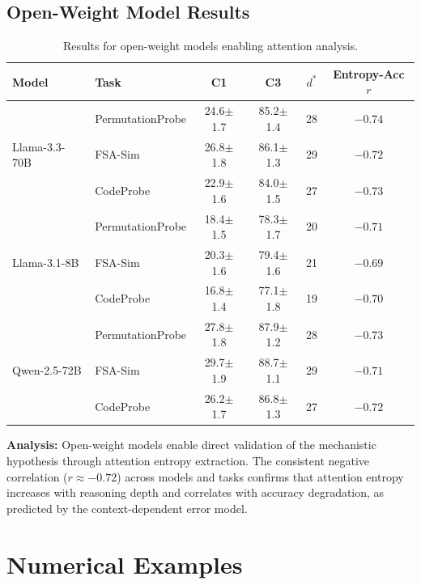 \documentclass{article}
\theoremstyle{plain}
\theoremstyle{definition}
\theoremstyle{remark}
\begin{document}
\subsection{Open-Weight Model Results}

\begin{table}[h]
\centering
\caption{Results for open-weight models enabling attention analysis.}
\label{tab:results_openweight}
\small
\begin{tabular}{@{}llcccc@{}}
\toprule
\textbf{Model} & \textbf{Task} & \textbf{C1} & \textbf{C3} & \textbf{$d^*$} & \textbf{Entropy-Acc $r$} \\
\midrule
\multirow{3}{*}{Llama-3.3-70B}
& PermutationProbe & 24.6$\pm$1.7 & 85.2$\pm$1.4 & 28 & $-0.74$ \\
& FSA-Sim & 26.8$\pm$1.8 & 86.1$\pm$1.3 & 29 & $-0.72$ \\
& CodeProbe & 22.9$\pm$1.6 & 84.0$\pm$1.5 & 27 & $-0.73$ \\
\midrule
\multirow{3}{*}{Llama-3.1-8B}
& PermutationProbe & 18.4$\pm$1.5 & 78.3$\pm$1.7 & 20 & $-0.71$ \\
& FSA-Sim & 20.3$\pm$1.6 & 79.4$\pm$1.6 & 21 & $-0.69$ \\
& CodeProbe & 16.8$\pm$1.4 & 77.1$\pm$1.8 & 19 & $-0.70$ \\
\midrule
\multirow{3}{*}{Qwen-2.5-72B}
& PermutationProbe & 27.8$\pm$1.8 & 87.9$\pm$1.2 & 28 & $-0.73$ \\
& FSA-Sim & 29.7$\pm$1.9 & 88.7$\pm$1.1 & 29 & $-0.71$ \\
& CodeProbe & 26.2$\pm$1.7 & 86.8$\pm$1.3 & 27 & $-0.72$ \\
\bottomrule
\end{tabular}
\end{table}

\textbf{Analysis:} Open-weight models enable direct validation of the mechanistic hypothesis through attention entropy extraction. The consistent negative correlation ($r \approx -0.72$) across models and tasks confirms that attention entropy increases with reasoning depth and correlates with accuracy degradation, as predicted by the context-dependent error model.


\section{Numerical Examples}
\label{app:numerical}
\end{document}
